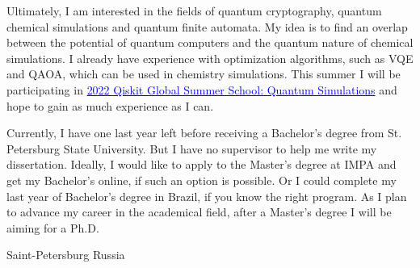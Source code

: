 \documentclass[11pt,a4paper,sans]{moderncv}        %
\begin{document}
	Ultimately, I am interested in the fields of quantum cryptography, quantum chemical simulations and quantum finite automata. My idea is to find an overlap between the potential of quantum computers and the quantum nature of chemical simulations. I already have experience with optimization algorithms, such as VQE and QAOA, which can be used in chemistry simulations. This summer I will be participating in \href{https://qiskit.org/events/summer-school/}{\textcolor{blue}{2022 Qiskit Global Summer School: Quantum Simulations}} and hope to gain as much experience as I can.
	
	Currently, I have one last year left before receiving a Bachelor's degree from St. Petersburg State University. But I have no supervisor to help me write my dissertation. Ideally, I would like to apply to the Master's degree at IMPA and get my Bachelor's online, if such an option is possible. Or I could complete my last year of Bachelor's degree in Brazil, if you know the right program. As I plan to advance my career in the academical field, after a Master's degree I will be aiming for a Ph.D.
	
	\title{}
	\address{Novoizmailovsky prospect, 16k8}{Saint-Petersburg}{ Russia }
	\makeletterclosing
	\name{}{}
\end{document}

